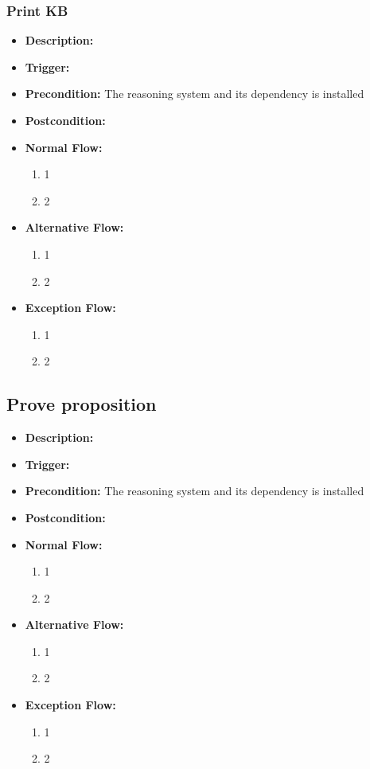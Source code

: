 \documentclass[../gr-final.tex]{subfiles}
\begin{document}
\subsubsection{Print KB}
\begin{itemize}
  \item {\bfseries Description:} 
  \item {\bfseries Trigger:}
  \item {\bfseries Precondition:} The reasoning system and its
    dependency is installed
    
  \item {\bfseries Postcondition:}

  \item {\bfseries Normal Flow:}
    \begin{enumerate}
      \item 1
      \item 2
    \end{enumerate}
  \item {\bfseries Alternative Flow:}
    \begin{enumerate}
      \item 1
      \item 2
    \end{enumerate}
  \item {\bfseries Exception Flow:}
    \begin{enumerate}
      \item 1
      \item 2
    \end{enumerate}
\end{itemize}

\subsection{Prove proposition}
\begin{itemize}
  \item {\bfseries Description:} 
  \item {\bfseries Trigger:}
  \item {\bfseries Precondition:} The reasoning system and its
    dependency is installed
    
  \item {\bfseries Postcondition:}

  \item {\bfseries Normal Flow:}
    \begin{enumerate}
      \item 1
      \item 2
    \end{enumerate}
  \item {\bfseries Alternative Flow:}
    \begin{enumerate}
      \item 1
      \item 2
    \end{enumerate}
  \item {\bfseries Exception Flow:}
    \begin{enumerate}
      \item 1
      \item 2
    \end{enumerate}
\end{itemize}
\end{document}
